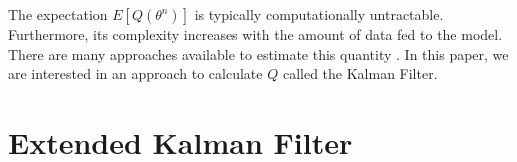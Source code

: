 \documentclass[mscthesis]{usiinfthesis}
\begin{document}
The expectation $E[Q(\theta^n)]$ is typically computationally untractable. Furthermore, its complexity increases with the amount of data fed to the model. There are many approaches available to estimate this quantity \cite{book:EMBook}. In this paper, we are interested in an approach to calculate $Q$ called the Kalman Filter.


%
%


%
%
%
%



\section{Extended Kalman Filter}
\label{sec:kalman}
\end{document}
